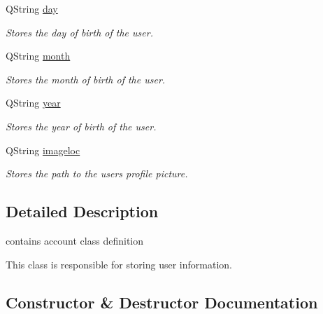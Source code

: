 \begin{DoxyCompactItemize}
\mbox{\label{classaccount_a2eac80bf8c7030c94481337454c3684f}} 
Q\+String \hyperlink{classaccount_a2eac80bf8c7030c94481337454c3684f}{day}
\begin{DoxyCompactList}\small\item\em Stores the day of birth of the user. \end{DoxyCompactList}\item 
\mbox{\label{classaccount_a8aea450d904b316735fd70160470beee}} 
Q\+String \hyperlink{classaccount_a8aea450d904b316735fd70160470beee}{month}
\begin{DoxyCompactList}\small\item\em Stores the month of birth of the user. \end{DoxyCompactList}\item 
\mbox{\label{classaccount_a41804fe41818b5e4d3bfee2fd8d7004b}} 
Q\+String \hyperlink{classaccount_a41804fe41818b5e4d3bfee2fd8d7004b}{year}
\begin{DoxyCompactList}\small\item\em Stores the year of birth of the user. \end{DoxyCompactList}\item 
\mbox{\label{classaccount_aa785bcd038780299cc3e9a245fc357a3}} 
Q\+String \hyperlink{classaccount_aa785bcd038780299cc3e9a245fc357a3}{imageloc}
\begin{DoxyCompactList}\small\item\em Stores the path to the user\textquotesingle{}s profile picture. \end{DoxyCompactList}\end{DoxyCompactItemize}


\subsection{Detailed Description}
contains account class definition 

This class is responsible for storing user information. 

\subsection{Constructor \& Destructor Documentation}
\mbox{\label{classaccount_a0330688878c8da389718a3b880ad59ac}} 
